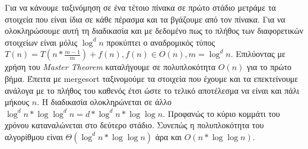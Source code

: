 \documentclass[a4paper,10pt]{article} \usepackage{anysize}
\begin{document}
Για να κάνουμε ταξινόμηση σε ένα τέτοιο πίνακα σε πρώτο στάδιο μετράμε τα
στοιχεία που είναι ίδια σε κάθε πέρασμα και τα βγάζουμε από τον πίνακα. Για να
ολοκληρώσουμε αυτή τη διαδικασία και με δεδομένο πως το πλήθος των
διαφορετικών στοιχείων είναι μόλις $\log^d{n}$ προκύπτει ο αναδρομικός τύπος
$T(n)=T(n*\frac{m-1}{m})+f(n),f(n) \in O(n),m=\log^d{n}$. Επιλύοντας με χρήση
του \textit{Master Theorem} καταλήγουμε σε πολυπλοκότητα $O(n)$ για το πρώτο
βήμα. Έπειτα με mergesort ταξινομούμε τα στοιχεία που έχουμε και τα
επεκτείνουμε ανάλογα με το πλήθος του καθενός έτσι ώστε το τελικό αποτέλεσμα
να είναι και πάλι μήκους $n$. Η διαδικασία ολοκληρώνεται σε άλλο
$\log^d{n}*\log{\log^d{n}}=d*\log^d{n}*\log{\log{n}}$. Προφανώς το κύριο
κομμάτι του χρόνου  καταναλώνεται στο δεύτερο στάδιο. Συνεπώς η πολυπλοκότητα
του αλγορίθμου είναι $\Theta(\log^d{n}*\log{\log{n}})$ άρα και
$O(n*\log{\log{n}})$.


\end{document}
